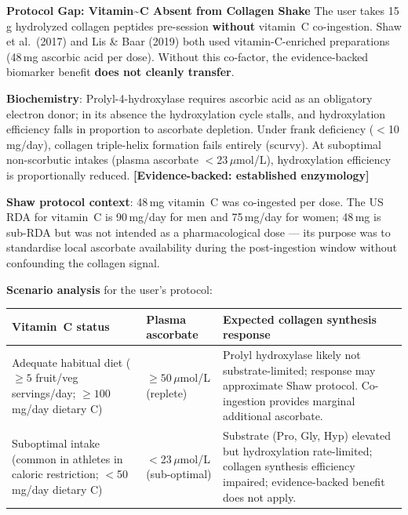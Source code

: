 \begin{warningbox}{\textbf{Protocol Gap: Vitamin\textasciitilde{}C Absent from Collagen Shake}}
The user takes 15\,g hydrolyzed collagen peptides pre-session \textbf{without} vitamin~C co-ingestion. Shaw et al.\ (2017) and Lis \& Baar (2019) both used vitamin-C-enriched preparations (48\,mg ascorbic acid per dose). Without this co-factor, the evidence-backed biomarker benefit \textbf{does not cleanly transfer}.
\end{warningbox}

\textbf{Biochemistry}: Prolyl-4-hydroxylase requires ascorbic acid as an obligatory electron donor; in its absence the hydroxylation cycle stalls, and hydroxylation efficiency falls in proportion to ascorbate depletion. Under frank deficiency ($<$10\,mg/day), collagen triple-helix formation fails entirely (scurvy). At suboptimal non-scorbutic intakes (plasma ascorbate $<$23\,$\mu$mol/L), hydroxylation efficiency is proportionally reduced. \textbf{[Evidence-backed: established enzymology]}

\textbf{Shaw protocol context}: 48\,mg vitamin~C was co-ingested per dose. The US RDA for vitamin~C is 90\,mg/day for men and 75\,mg/day for women; 48\,mg is sub-RDA but was not intended as a pharmacological dose --- its purpose was to standardise local ascorbate availability during the post-ingestion window without confounding the collagen signal.

\textbf{Scenario analysis} for the user's protocol:

\begin{center}
\begin{tabular}{>{\raggedright\arraybackslash}p{3.2cm}
                >{\raggedright\arraybackslash}p{3.8cm}
                >{\raggedright\arraybackslash}p{5.5cm}}
\toprule
\textbf{Vitamin~C status} & \textbf{Plasma ascorbate} & \textbf{Expected collagen synthesis response} \\
\midrule
Adequate habitual diet (${\geq}5$ fruit/veg servings/day; ${\geq}100$\,mg/day dietary C) & ${\geq}50$\,$\mu$mol/L (replete) & Prolyl hydroxylase likely not substrate-limited; response may approximate Shaw protocol. Co-ingestion provides marginal additional ascorbate. \\
\addlinespace
Suboptimal intake (common in athletes in caloric restriction; $<$50\,mg/day dietary C) & $<$23\,$\mu$mol/L (sub-optimal) & Substrate (Pro, Gly, Hyp) elevated but hydroxylation rate-limited; collagen synthesis efficiency impaired; evidence-backed benefit does not apply. \\
\bottomrule
\end{tabular}
\end{center}

